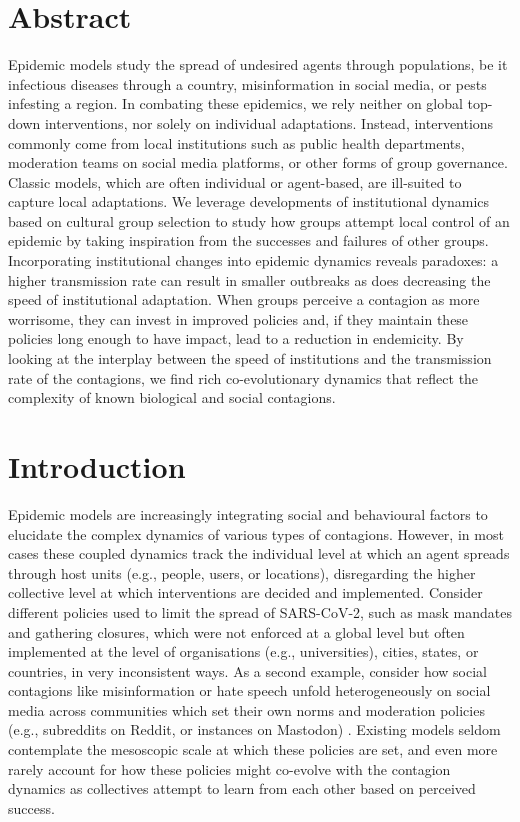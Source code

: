 \section*{Abstract}

Epidemic models study the spread of undesired agents through populations, be it infectious diseases through a country, misinformation in social media, or pests infesting a region. In combating these epidemics, we rely neither on global top-down interventions, nor solely on individual adaptations. Instead, interventions commonly come from local institutions such as public health departments, moderation teams on social media platforms, or other forms of group governance. Classic models, which are often individual or agent-based, are ill-suited to capture local adaptations. We leverage developments of institutional dynamics based on cultural group selection to study how groups attempt local control of an epidemic by taking inspiration from the successes and failures of other groups. Incorporating institutional changes into epidemic dynamics reveals paradoxes: a higher transmission rate can result in smaller outbreaks as does decreasing the speed of institutional adaptation. When groups perceive a contagion as more worrisome, they can invest in improved policies and, if they maintain these policies long enough to have impact, lead to a reduction in endemicity.  By looking at the interplay between the speed of institutions and the transmission rate of the contagions, we find rich co-evolutionary dynamics that reflect the complexity of known biological and social contagions.

\setcounter{section}{0}

\section{Introduction}
\label{coevo.section.introduction}

Epidemic models are increasingly integrating social and behavioural factors to elucidate the complex dynamics of various types of contagions. However, in most cases these coupled dynamics track the individual level at which an agent spreads through host units (e.g., people, users, or locations), disregarding the higher collective level at which interventions are decided and implemented. 
Consider different policies used to limit the spread of SARS-CoV-2, such as mask mandates and gathering closures, which were not enforced at a global level but often implemented at the level of organisations (e.g., universities), cities, states, or countries, in very inconsistent ways\cite{adolph_pandemic_2020,gupta_tracking_2021, althouse_unintended_2020,klein_higher_2021}. As a second example, consider how social contagions like misinformation or hate speech unfold heterogeneously on social media across communities which set their own norms and moderation policies (e.g., subreddits on Reddit, or instances on Mastodon) \cite{gibson_free_2019, bozarth_wisdom_2023}. Existing models seldom contemplate the mesoscopic scale at which these policies are set, and even more rarely account for how these policies might co-evolve with the contagion dynamics as collectives attempt to learn from each other based on perceived success.

